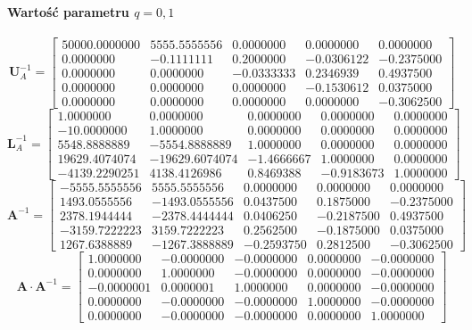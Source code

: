 \documentclass[a4paper]{article}
\begin{document}
\paragraph{Wartość parametru $q = 0,1$}
$$
\textbf{U}_A^{-1} = 
\left[
\begin{array}{ccccc}
50000.0000000&5555.5555556&0.0000000&0.0000000&0.0000000\\ 
0.0000000&-0.1111111&0.2000000&-0.0306122&-0.2375000\\ 
0.0000000&0.0000000&-0.0333333&0.2346939&0.4937500\\ 
0.0000000&0.0000000&0.0000000&-0.1530612&0.0375000\\ 
0.0000000&0.0000000&0.0000000&0.0000000&-0.3062500
\end{array}
\right]
$$
$$
\textbf{L}_A^{-1} = 
\left[
\begin{array}{ccccc}
1.0000000&0.0000000&0.0000000&0.0000000&0.0000000\\ 
-10.0000000&1.0000000&0.0000000&0.0000000&0.0000000\\ 
5548.8888889&-5554.8888889&1.0000000&0.0000000&0.0000000\\ 
19629.4074074&-19629.6074074&-1.4666667&1.0000000&0.0000000\\ 
-4139.2290251&4138.4126986&0.8469388&-0.9183673&1.0000000
\end{array}
\right]
$$
$$
\textbf{A}^{-1} = 
\left[
\begin{array}{ccccc}
-5555.5555556&5555.5555556&0.0000000&0.0000000&0.0000000\\ 
1493.0555556&-1493.0555556&0.0437500&0.1875000&-0.2375000\\ 
2378.1944444&-2378.4444444&0.0406250&-0.2187500&0.4937500\\ 
-3159.7222223&3159.7222223&0.2562500&-0.1875000&0.0375000\\ 
1267.6388889&-1267.3888889&-0.2593750&0.2812500&-0.3062500
\end{array}
\right]
$$
$$
\textbf{A} \cdot \textbf{A}^{-1} = 
\left[
\begin{array}{ccccc}
1.0000000&-0.0000000&-0.0000000&0.0000000&-0.0000000\\ 
0.0000000&1.0000000&-0.0000000&0.0000000&-0.0000000\\ 
-0.0000001&0.0000001&1.0000000&0.0000000&-0.0000000\\ 
0.0000000&-0.0000000&-0.0000000&1.0000000&-0.0000000\\ 
0.0000000&-0.0000000&-0.0000000&0.0000000&1.0000000
\end{array}
\right]
$$
\end{document}
